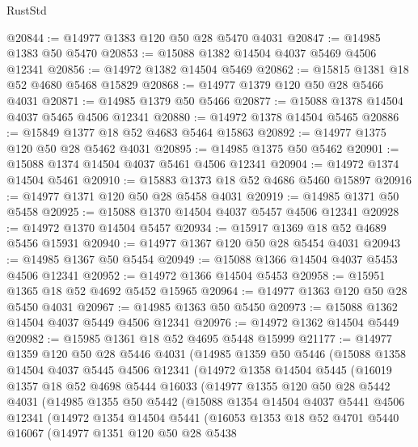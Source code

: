 \begin{lexlean}{RustStd}
\begin{coremodule}
@20844 := @14977 @1383 @120 @50 @28 @5470 @4031
@20847 := @14985 @1383 @50 @5470
@20853 := @15088 @1382 @14504 @4037 @5469 @4506 @12341
@20856 := @14972 @1382 @14504 @5469
@20862 := @15815 @1381 @18 @52 @4680 @5468 @15829
@20868 := @14977 @1379 @120 @50 @28 @5466 @4031
@20871 := @14985 @1379 @50 @5466
@20877 := @15088 @1378 @14504 @4037 @5465 @4506 @12341
@20880 := @14972 @1378 @14504 @5465
@20886 := @15849 @1377 @18 @52 @4683 @5464 @15863
@20892 := @14977 @1375 @120 @50 @28 @5462 @4031
@20895 := @14985 @1375 @50 @5462
@20901 := @15088 @1374 @14504 @4037 @5461 @4506 @12341
@20904 := @14972 @1374 @14504 @5461
@20910 := @15883 @1373 @18 @52 @4686 @5460 @15897
@20916 := @14977 @1371 @120 @50 @28 @5458 @4031
@20919 := @14985 @1371 @50 @5458
@20925 := @15088 @1370 @14504 @4037 @5457 @4506 @12341
@20928 := @14972 @1370 @14504 @5457
@20934 := @15917 @1369 @18 @52 @4689 @5456 @15931
@20940 := @14977 @1367 @120 @50 @28 @5454 @4031
@20943 := @14985 @1367 @50 @5454
@20949 := @15088 @1366 @14504 @4037 @5453 @4506 @12341
@20952 := @14972 @1366 @14504 @5453
@20958 := @15951 @1365 @18 @52 @4692 @5452 @15965
@20964 := @14977 @1363 @120 @50 @28 @5450 @4031
@20967 := @14985 @1363 @50 @5450
@20973 := @15088 @1362 @14504 @4037 @5449 @4506 @12341
@20976 := @14972 @1362 @14504 @5449
@20982 := @15985 @1361 @18 @52 @4695 @5448 @15999
@21177 := @14977
    @1359
    @120
    @50
    @28
    @5446
    @4031
    (@14985
      @1359
      @50
      @5446
      (@15088
        @1358
        @14504
        @4037
        @5445
        @4506
        @12341
        (@14972
          @1358
          @14504
          @5445
          (@16019
            @1357
            @18
            @52
            @4698
            @5444
            @16033
            (@14977
              @1355
              @120
              @50
              @28
              @5442
              @4031
              (@14985
                @1355
                @50
                @5442
                (@15088
                  @1354
                  @14504
                  @4037
                  @5441
                  @4506
                  @12341
                  (@14972
                    @1354
                    @14504
                    @5441
                    (@16053
                      @1353
                      @18
                      @52
                      @4701
                      @5440
                      @16067
                      (@14977
                        @1351
                        @120
                        @50
                        @28
                        @5438

\end{coremodule}
\end{lexlean}
